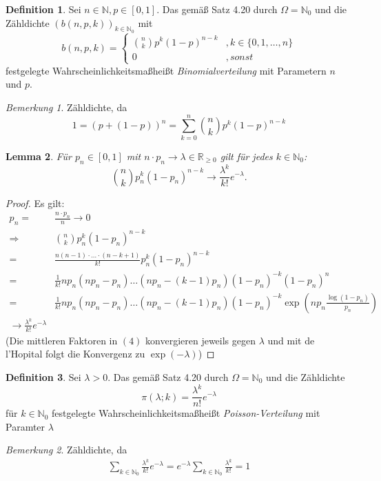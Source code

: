 \documentclass[a4paper,12pt,fleqn]{scrartcl}
\newcommand{\N}{\mathbb{N}}
\newcommand{\R}{\mathbb{R}}
\newcommand{\WM}{Wahrscheinlichkeitsmaß}
\newcommand{\impl}{\Rightarrow}
\theoremstyle{definition}
\newtheorem{definition}{Definition}[section]
\theoremstyle{plain}
\newtheorem{lemma}[definition]{Lemma}
\theoremstyle{remark}
\newtheorem*{bemerkung}{Bemerkung}
\begin{document}
\begin{definition}
Sei $n\in\N,p\in\left[ 0,1\right]$. Das gemäß Satz 4.20 durch $\Omega=\N_0$ und die Zähldichte $(b(n,p,k))_{k\in\N_0}$ mit
\[b(n,p,k)=\begin{cases}
\binom{n}{k}p^k(1-p)^{n-k}&,k\in\{ 0,1,\ldots,n\}\\
0&,sonst
\end{cases}\]
festgelegte \WM heißt \emph{Binomialverteilung} mit Parametern $n$ und $p$.
\end{definition}
\begin{bemerkung}
Zähldichte, da
\[1=(p+(1-p))^n=\sum_{k=0}^n\binom{n}{k}p^k(1-p)^{n-k}\]
\end{bemerkung}
\begin{lemma}
Für $p_n\in\left[ 0,1\right]$ mit $n\cdot p_n\to\lambda\in\R_{\geq 0}$ gilt für jedes $k\in\N_0$:
\[\binom{n}{k}p_n^k(1-p_n)^{n-k}\to\frac{\lambda^k}{k!}e^{-\lambda}.\]
\end{lemma}
\begin{proof}
Es gilt:
\begin{align}
p_n=&\frac{n\cdot p_n}{n}\to 0\\
\impl &\binom{n}{k}p_n^k(1-p_n)^{n-k}\\
=&\frac{n(n-1)\cdot\ldots\cdot(n-k+1)}{k!}p_n^k(1-p_n)^{n-k}\\
=&\frac{1}{k!}np_n(np_n-p_n)\ldots(np_n-(k-1)p_n)(1-p_n)^{-k}(1-p_n)^n\\ 
=&\frac{1}{k!}np_n(np_n-p_n)\ldots(np_n-(k-1)p_n)(1-p_n)^{-k}\exp(np_n\frac{\log(1-p_n)}{p_n})\\ 
\rightarrow\frac{\lambda^k}{k!}e^{-\lambda}
\end{align}
(Die mittleren Faktoren in $(4)$ konvergieren jeweils gegen $\lambda$ und mit de l'Hopital folgt die Konvergenz zu $\exp(-\lambda)$)
\end{proof}
\begin{definition}
Sei $\lambda>0$. Das gemäß Satz 4.20 durch $\Omega=\N_0$ und die Zähldichte
\[\pi(\lambda;k)=\frac{\lambda^k}{n!}e^{-\lambda}\]
für $k\in\N_0$ festgelegte \WM heißt \emph{Poisson-Verteilung} mit Paramter $\lambda$
\end{definition}
\begin{bemerkung}
Zähldichte, da
\begin{align*}
\sum_{k\in\N_0}\frac{\lambda^k}{k!}e^{-\lambda}=e^{-\lambda}\sum_{k\in\N_0}\frac{\lambda^k}{k!}=1
\end{align*}
\end{bemerkung}
\end{document}
